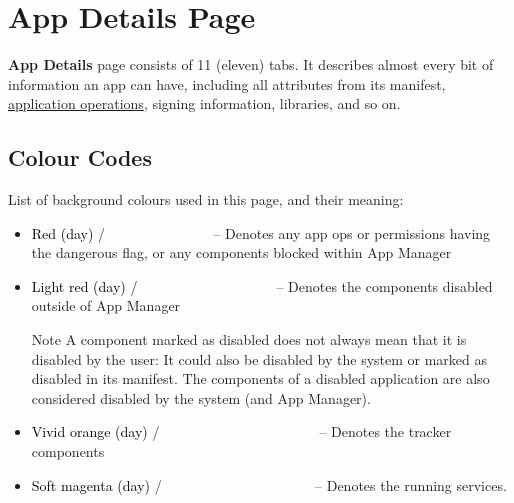 \section{App Details Page}\label{sec:app-details-page} %
\textbf{App Details} page consists of 11 (eleven) tabs. It describes almost every bit of information an app
can have, including all attributes from its manifest, \hyperref[ch:app-ops]{application operations}, signing
information, libraries, and so on.

\subsection{Colour Codes}\label{subsec:app-details-colour-codes} %
List of background colours used in this page, and their meaning:
\begin{itemize}
    \item \colorbox{AMRed}{\textcolor{black}{Red (day)}} / \colorbox{AMDarkRed}{\textcolor{white}{dark red (night)}}
    -- Denotes any app ops or permissions having the dangerous flag, or any components blocked within App Manager

    \item \colorbox{AMLightRed}{\textcolor{black}{Light red (day)}} / \colorbox{AMVeryDarkRed}{\textcolor{white}{very
    dark red (night)}} -- Denotes the components disabled outside of App Manager

    \begin{tip}{Note}
        A component marked as disabled does not always mean that it is disabled by the user: It could also be disabled
        by the system or marked as disabled in its manifest. The components of a disabled application are also
        considered disabled by the system (and App Manager).
    \end{tip}

    \item \colorbox{AMVividOrange}{\textcolor{black}{Vivid orange (day)}} / \colorbox{AMVeryDarkOrange}{
        \textcolor{white}{very dark orange (night)}} -- Denotes the tracker components

    \item \colorbox{AMSoftMagenta}{\textcolor{black}{Soft magenta (day)}} / \colorbox{AMVeryDarkViolet}{
        \textcolor{white}{very dark violet (night)}} -- Denotes the running services.
\end{itemize}

